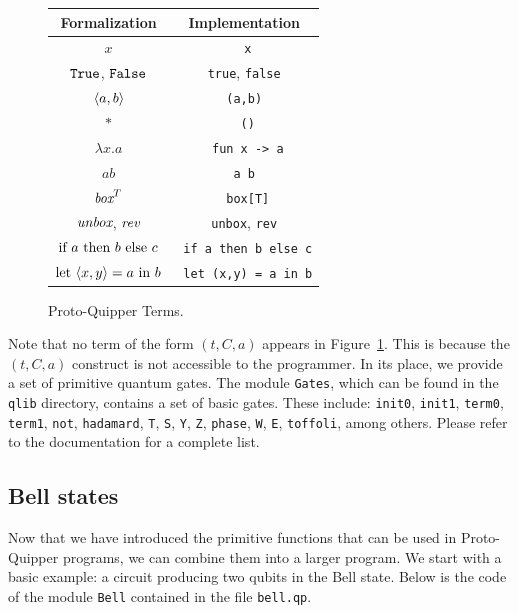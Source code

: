 \begin{figure}[!ht]
\begin{center}
\renewcommand{\arraystretch}{1.4}
\begin{tabular}{|c|c|}
  \hline
  \textbf{Formalization}          & \textbf{Implementation} \\\hline
  $x$                             & \verb# x# \\\hline
  $\texttt{True}$, $\texttt{False}$               & \verb#true#, \verb#false# \\\hline
  $\langle a, b \rangle$                   & \verb# (a,b) # \\\hline
  $*$                             & \verb# ()# \\\hline
  $\lambda x.a$                   & \verb# fun x -> a# \\\hline
  $a b$                        & \verb#a b# \\\hline
  $\mathop{\textit{box}}\nolimits^T$                       & \verb# box[T]# \\\hline
  $\mathop{\textit{unbox}}\nolimits$, $\mathop{\textit{rev}}\nolimits$                & \verb#unbox#, \verb#rev# \\\hline
  $\textrm{\rm if}~ a ~\textrm{\rm then}~ b ~\textrm{\rm else}~ c$          & \verb# if a then b else c# \\\hline
  $\textrm{\rm let}~ \langle x,y\rangle = a ~\textrm{\rm in}~ b$         & \verb# let (x,y) = a in b# \\\hline
\end{tabular}
\end{center}
\caption{Proto-Quipper Terms.}
\label{terms}
\end{figure}

Note that no term of the form $(t,C,a)$ appears in
Figure~\hyperref[terms]{\ref*{terms}}. This is because the $(t,C,a)$
construct is
not accessible to the programmer. In its place, we provide a set of 
primitive quantum gates. The module \verb#Gates#, which can be found in the 
\verb#qlib# directory, contains a set of basic gates. 
These include: \verb#init0#, \verb#init1#, \verb#term0#, \verb#term1#, 
\verb#not#, \verb#hadamard#, \verb#T#, \verb#S#, \verb#Y#, \verb#Z#, 
\verb#phase#, \verb#W#, \verb#E#, \verb#toffoli#, among others. Please
refer to the documentation for a complete list.

\subsection{Bell states}
\label{ssec-quipper-by-e}

Now that we have introduced the primitive functions that can be used in Proto-Quipper programs, we can combine them into a larger program. We start with 
a basic example: a circuit producing two qubits in the Bell state. Below is
the code of the module \verb#Bell# contained in the file \verb#bell.qp#.

